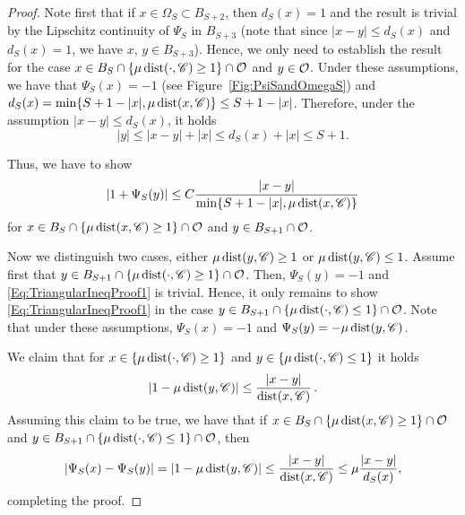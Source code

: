 \begin{proof}
Note first that if $x\in \Omega_S \subset B_{S+2}$, then $d_S(x)=1$ and the result is trivial by the Lipschitz continuity of $\Psi_S$ in $B_{S+3}$ (note that since $|x-y|\leq d_S(x)$ and $d_S(x) = 1$, we have $x$, $y\in B_{S+3}$). Hence, we only need to establish the result for the case $x\in B_S\cap \{\mu \operatorname{dist}(\cdot,\mathscr{C})\geq 1\} \cap \mathcal{O}$ and $y\in \mathcal{O}$. Under these assumptions, we have that $\Psi_S(x)=-1$ (see Figure~\ref{Fig:PsiSandOmegaS}) and $d_S(x) = \min\{S+1-|x|,\mu \operatorname{dist}(x,\mathscr{C})\} \leq S+1-|x|$. Therefore, under the assumption $|x-y|\leq d_S(x)$, it holds
$$
 |y|\leq |x-y| + |x| \leq d_S(x)+|x| \leq S+1. 
$$

Thus, we have to show
\begin{equation}
\label{Eq:TriangularIneqProof1}
	|1+\Psi_S(y)|\leq C\dfrac{|x-y|}{\min\{S+1-|x|,\mu \operatorname{dist}(x,\mathscr{C})\}}
\end{equation}
for $x\in B_S\cap \{\mu\operatorname{dist}(x,\mathscr{C})\geq 1\} \cap \mathcal{O}$ and $y \in B_{S+1}\cap \mathcal{O}$.

Now we distinguish two cases, either $\mu\operatorname{dist}(y,\mathscr{C})\geq 1$ or $\mu \operatorname{dist}(y,\mathscr{C})\leq 1$. Assume first that $y\in B_{S+1} \cap \{\mu \operatorname{dist}(\cdot,\mathscr{C})\geq 1\}\cap \mathcal{O}$. Then, $\Psi_S(y)=-1$ and \eqref{Eq:TriangularIneqProof1} is trivial. Hence, it only remains to show \eqref{Eq:TriangularIneqProof1} in the case $y\in B_{S+1} \cap \{\mu \operatorname{dist}(\cdot,\mathscr{C})\leq 1\}\cap \mathcal{O}$. Note that under these assumptions, $\Psi_S(x)=-1$ and $\Psi_S(y)=-\mu \operatorname{dist}(y,\mathscr{C})$. 

We claim that for $x \in \{\mu \operatorname{dist}(\cdot,\mathscr{C})\geq 1\}$ and $y \in \{\mu \operatorname{dist}(\cdot,\mathscr{C})\leq 1\}$ it holds
\begin{equation}
\label{Eq:TriangularIneqProof2}
|1-\mu \operatorname{dist}(y,\mathscr{C})|\leq \dfrac{|x-y|}{\operatorname{dist}(x,\mathscr{C})}\,.
\end{equation}
Assuming this claim to be true, we have that if $x\in B_S\cap \{\mu \operatorname{dist}(x,\mathscr{C})\geq 1\} \cap \mathcal{O}$ and $y\in B_{S+1} \cap \{\mu \operatorname{dist}(\cdot,\mathscr{C})\leq 1\}\cap \mathcal{O}$, then
$$ 
|\Psi_S(x)-\Psi_S(y)| = |1-\mu \operatorname{dist}(y,\mathscr{C})| \leq \frac{|x-y|}{\operatorname{dist}(x,\mathscr{C})} \leq  \mu \frac{|x-y|}{d_S(x)},
$$
completing the proof.


\end{proof}
